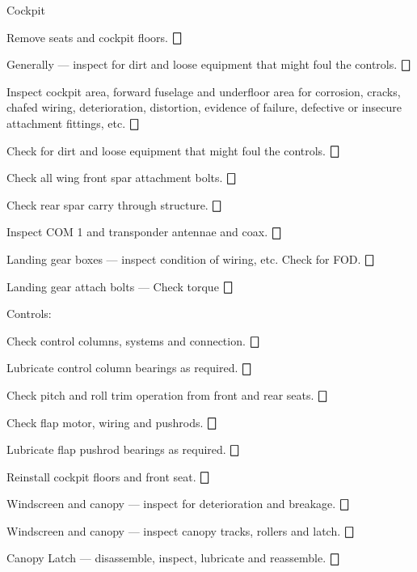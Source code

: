 \begin{enumerate*}
	\item{Cockpit} 
	\begin{enumerate*}
		\item Remove seats and cockpit floors. \dotfill $\bigbox$
		\item Generally --- inspect for dirt and loose equipment that might foul the controls. \dotfill $\bigbox$
		\item Inspect cockpit area, forward fuselage and underfloor area for corrosion, cracks, chafed wiring, deterioration, distortion, evidence of failure, defective or insecure attachment fittings, etc. \dotfill $\bigbox$
		\item Check for dirt and loose equipment that might foul the controls. \dotfill $\bigbox$
		\item Check all wing front spar attachment bolts. \dotfill $\bigbox$
		\item Check rear spar carry through structure. \dotfill $\bigbox$
		\item Inspect COM 1 and transponder antennae and coax. \dotfill $\bigbox$
		\item Landing gear boxes --- inspect condition of wiring, etc. Check for FOD. \dotfill $\bigbox$
		\item Landing gear attach bolts --- Check torque \dotfill $\bigbox$
		\item Controls:
  	\begin{enumerate*}
  		\item Check control columns, systems and connection. \dotfill $\bigbox$
  		\item Lubricate control column bearings as required. \dotfill $\bigbox$
  		\item Check pitch and roll trim operation from front and rear seats. \dotfill $\bigbox$
  		\item Check flap motor, wiring and pushrods. \dotfill $\bigbox$
  		\item Lubricate flap pushrod bearings as required. \dotfill $\bigbox$
  	  \end{enumerate*}
		\item Reinstall cockpit floors and front seat. \dotfill $\bigbox$
		\item Windscreen and canopy --- inspect for deterioration and breakage. \dotfill $\bigbox$
		\item Windscreen and canopy --- inspect canopy tracks, rollers and latch. \dotfill $\bigbox$
		\item Canopy Latch --- disassemble, inspect, lubricate and reassemble. \dotfill $\bigbox$

\end{enumerate*}
\end{enumerate*}
